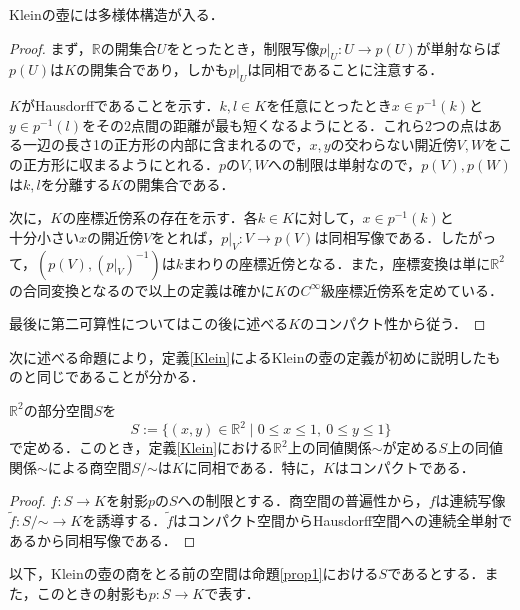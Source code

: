 \documentclass[uplatex]{jsarticle}
\begin{document}
\begin{proposition}
  Kleinの壺には多様体構造が入る．
\end{proposition}
\begin{proof}
  まず，$\mathbb{R}$の開集合$U$をとったとき，制限写像$\left.p\right|_{U}\colon U\to p(U)$が単射ならば$p(U)$は$K$の開集合であり，しかも$\left.p\right|_{U}$は同相であることに注意する．

  $K$がHausdorffであることを示す．$k,l\in K$を任意にとったとき$x\in p^{-1}(k)$と$y\in p^{-1}(l)$をその2点間の距離が最も短くなるようにとる．これら2つの点はある一辺の長さ1の正方形の内部に含まれるので，$x,y$の交わらない開近傍$V,W$をこの正方形に収まるようにとれる．$p$の$V,W$への制限は単射なので，$p(V),p(W)$は$k,l$を分離する$K$の開集合である．

  次に，$K$の座標近傍系の存在を示す．各$k\in K$に対して，$x\in p^{-1}(k)$と$十分小さいx$の開近傍$V$をとれば，$\left.p\right|_{V}\colon V\to p(V)$は同相写像である．したがって，$(p(V),(\left.p\right|_{V})^{-1})$は$k$まわりの座標近傍となる．また，座標変換は単に$\mathbb{R}^2$の合同変換となるので以上の定義は確かに$K$の$C^{\infty}$級座標近傍系を定めている．

  最後に第二可算性についてはこの後に述べる$K$のコンパクト性から従う．
\end{proof}
次に述べる命題により，定義\ref{Klein}によるKleinの壺の定義が初めに説明したものと同じであることが分かる．
\begin{proposition}\label{prop1}
  $\mathbb{R}^2$の部分空間$S$を
  \[ S:=\{(x,y)\in\mathbb{R}^2\mid 0\leq x\leq 1,\ 0\leq y\leq 1\} \]
  で定める．このとき，定義\ref{Klein}における$\mathbb{R}^2$上の同値関係$\sim$が定める$S$上の同値関係$\sim$による商空間$S/\mathord{\sim}$は$K$に同相である．特に，$K$はコンパクトである．
\end{proposition}
\begin{proof}
  $f\colon S\to K$を射影$p$の$S$への制限とする．商空間の普遍性から，$f$は連続写像$\tilde{f}\colon S/\mathord{\sim}\to K$を誘導する．$\tilde{f}$はコンパクト空間からHausdorff空間への連続全単射であるから同相写像である．
\end{proof}
以下，Kleinの壺の商をとる前の空間は命題\ref{prop1}における$S$であるとする．また，このときの射影も$p\colon S\to K$で表す．
\end{document}
